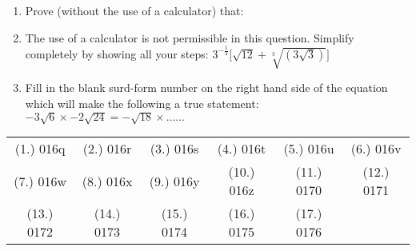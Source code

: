 \begin{eocexercises}{}
\begin{enumerate}
\item{Prove (without the use of a calculator) that:
}




\item{The use of a calculator is not permissible in this question. Simplify completely by showing all your steps: $3^{-\tfrac{1}{2}}\biggl[\sqrt{12} + \sqrt[3]{(3\sqrt{3})}\biggr]$}

\item{Fill in the blank surd-form number on the right hand side of the equation which will make the following a true statement:  $ -3\sqrt{6} \times -2\sqrt{24} = - \sqrt{18} \times \ldots \ldots $}

\end{enumerate}



\par \practiceinfo
\par \begin{tabular}[h]{cccccc}
(1.)	016q	&
(2.)	016r	&
(3.)	016s	&
(4.)	016t	&
(5.)	016u	&
(6.)	016v	\\ %
(7.)	016w	&
(8.)	016x	&
(9.)	016y	&
(10.)	016z	&
(11.)	0170	&
(12.)	0171	\\ %
(13.)	0172	&
(14.)	0173	&
(15.)	0174	&
(16.)	0175	&
(17.)	0176	&
\end{tabular}
\end{eocexercises} 





